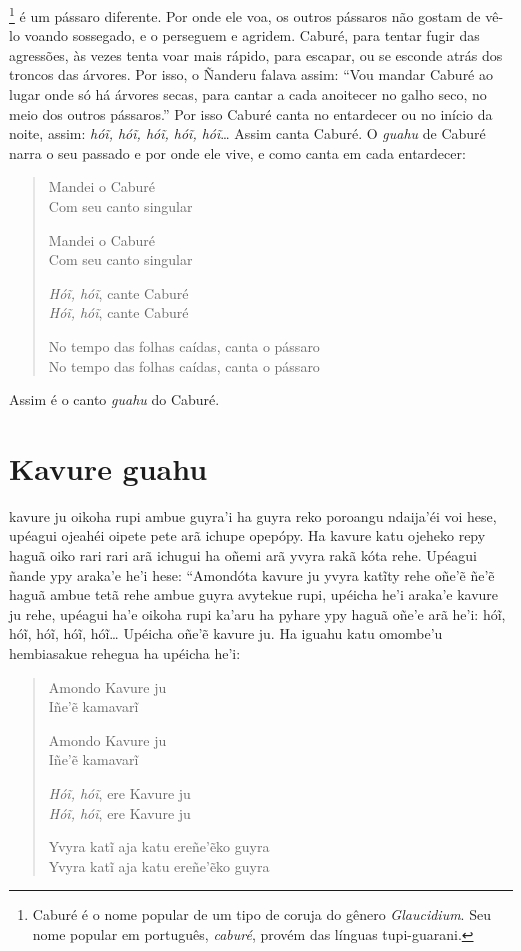 \footnote{Caburé é o nome popular de um tipo de coruja do gênero
  \textit{Glaucidium}. Seu nome popular em português, \textit{caburé},
  provém das línguas tupi-guarani.} é um pássaro diferente. Por onde ele
voa, os outros pássaros não gostam de vê-lo voando sossegado, e o
perseguem e agridem. Caburé, para tentar fugir das agressões, às vezes
tenta voar mais rápido, para escapar, ou se esconde atrás dos troncos
das árvores. Por isso, o Ñanderu falava assim: ``Vou mandar Caburé ao
lugar onde só há árvores secas, para cantar a cada anoitecer no galho
seco, no meio dos outros pássaros.'' Por isso Caburé canta no entardecer
ou no início da noite, assim: \textit{hóĩ, hóĩ, hóĩ, hóĩ, hóĩ}\ldots{} Assim canta
Caburé. O \textit{guahu} de Caburé narra o seu passado e por onde ele
vive, e como canta em cada entardecer:

\begin{verse}
Mandei o Caburé\\
Com seu canto singular

Mandei o Caburé\\
Com seu canto singular

\textit{Hóĩ, hóĩ}, cante Caburé\\
\textit{Hóĩ, hóĩ}, cante Caburé

No tempo das folhas caídas, canta o pássaro\\
No tempo das folhas caídas, canta o pássaro
\end{verse}

Assim é o canto \textit{guahu} do Caburé.

\chapter{Kavure guahu}

 kavure ju oikoha rupi ambue guyra'i ha guyra reko poroangu
ndaija'éi voi hese, upéagui ojeahéi oipete pete arã ichupe opepópy. Ha
kavure katu ojeheko repy haguã oiko rari rari arã ichugui ha oñemi arã
yvyra rakã kóta rehe. Upéagui ñande ypy araka'e he'i hese: ``Amondóta
kavure ju yvyra katĩty rehe oñe'ẽ ñe'ẽ haguã ambue tetã rehe ambue guyra
avytekue rupi, upéicha he'i araka'e kavure ju rehe, upéagui ha'e oikoha
rupi ka'aru ha pyhare ypy haguã oñe'e arã he'i: hóĩ, hóĩ, hóĩ, hóĩ,
hóĩ\ldots{} Upéicha oñe'ẽ kavure ju. Ha iguahu katu omombe'u hembiasakue
rehegua ha upéicha he'i:

\begin{verse}
Amondo Kavure ju\\
Iñe'ẽ kamavarĩ

Amondo Kavure ju\\
Iñe'ẽ kamavarĩ

\textit{Hóĩ, hóĩ}, ere Kavure ju\\
\textit{Hóĩ, hóĩ}, ere Kavure ju

Yvyra katĩ aja katu ereñe'ẽko guyra\\
Yvyra katĩ aja katu ereñe'ẽko guyra
\end{verse}

